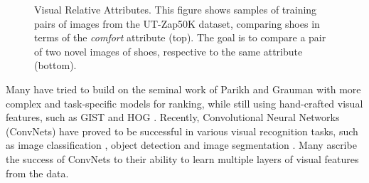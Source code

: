 \documentclass[runningheads]{llncs}
\begin{document}
\begin{figure}
{}
\caption{Visual Relative Attributes. This figure shows samples of training pairs of images from the UT-Zap50K dataset, comparing shoes in terms of the \textit{comfort} attribute (top). The goal is to compare a pair of two novel images of shoes, respective to the same attribute (bottom).}
\label{fig.1}
\end{figure}

Many have tried to build on the seminal work of Parikh and Grauman \cite{parikh2011} with more complex and task-specific models for ranking, while still using hand-crafted visual features, such as GIST \cite{Aude01} and HOG \cite{hog}. Recently, Convolutional Neural Networks (ConvNets) have proved to be successful in various visual recognition tasks, such as image classification \cite{Krizhevsky2012ImageNetCW}, object detection \cite{RCNN} and image segmentation \cite{fullyconv}. Many ascribe the success of ConvNets to their ability to learn multiple layers of visual features from the data. 
\end{document}
